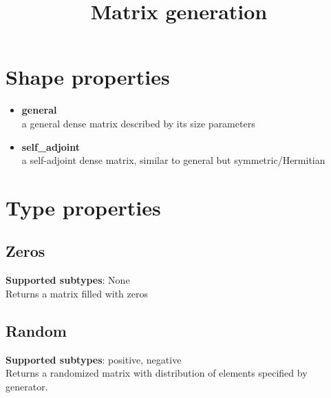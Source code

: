 \documentclass{article}
\title{Matrix generation}
\begin{document}
\section{Shape properties}

\begin{itemize}
\item \textbf{general} \\
a general dense matrix described by its size parameters
\item \textbf{self\_adjoint} \\
a self-adjoint dense matrix, similar to general but symmetric/Hermitian 
\end{itemize}

\section{Type properties}

\subsection{Zeros}
\textbf{Supported subtypes}: None \\
Returns a matrix filled with zeros

\subsection{Random}
\textbf{Supported subtypes}: positive, negative \\
Returns a randomized matrix with distribution of elements specified by generator.
\end{document}
